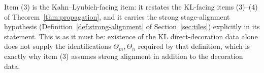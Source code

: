 \begin{remark}
\label{rem:realization-alignment}
Item (3) is the Kahn--Lyubich-facing item: it restates the KL-facing
items (3)--(4) of Theorem~\ref{thm:propagation}, and it carries the
strong stage-alignment hypothesis
(Definition~\ref{def:strong-alignment} of Section~\ref{sec:tiles})
explicitly in its statement.  This is as it must be: existence of the
KL direct-decoration data alone does not supply the identifications
\(\Theta_m,\Theta_n\) required by that definition, which is exactly
why item (3) assumes strong alignment in addition to the decoration
data.
\end{remark}